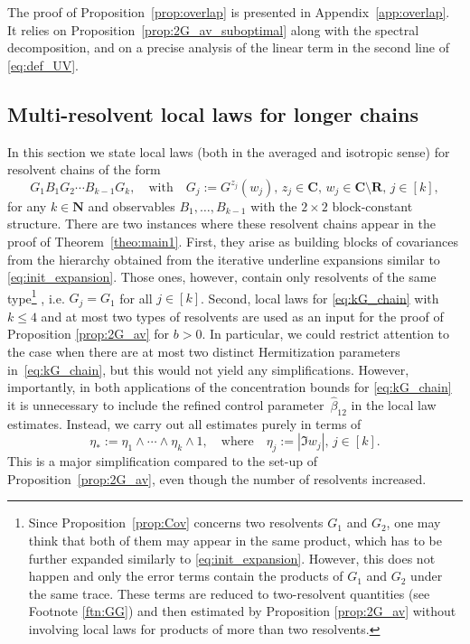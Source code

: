 \documentclass[10pt]{amsart}
\numberwithin{equation}{section}
\newcommand{\R}{\mathbf{R}}
\newcommand{\C}{\mathbf{C}}
\newcommand{\N}{\mathbf{N}}
\begin{document}
The proof of Proposition~\ref{prop:overlap} is presented in Appendix~\ref{app:overlap}. It relies on Proposition~\ref{prop:2G_av_suboptimal} along with the spectral decomposition, and on a precise analysis of the linear term in the second line of \eqref{eq:def_UV}.


\subsection{Multi-resolvent local laws for longer chains}
\label{sec:multlonggs}

In this section we state local laws (both in the averaged and isotropic sense) for resolvent chains of the form
\begin{equation}
G_1B_1G_2\cdots B_{k-1}G_k,\quad\text{with}\quad G_j:=G^{z_j}(w_j),\, z_j\in\C,\, w_j\in\C\setminus\R,\, j\in [k],
\label{eq:kG_chain}
\end{equation}
for any $k\in \N$ and observables $B_1,\ldots,B_{k-1}$ with the $2\times 2$ block-constant structure. There are two instances where these resolvent chains appear in the proof of Theorem~\ref{theo:main1}. First, they arise as building blocks of covariances from the hierarchy obtained from the iterative underline expansions similar to \eqref{eq:init_expansion}. Those ones, however, contain only resolvents of the same type\footnote{Since Proposition~\ref{prop:Cov} concerns two resolvents $G_1$ and $G_2$, one may think that both of them may appear in the same product, which has to be further expanded similarly to \eqref{eq:init_expansion}. However, this does not happen and only the error terms contain the products of $G_1$ and $G_2$ under the same trace. These terms are reduced to two-resolvent quantities (see Footnote \ref{ftn:GG}) and then estimated by Proposition \ref{prop:2G_av} without involving local laws for products of more than two resolvents.} , i.e. $G_j=G_1$ for all $j\in [k]$. Second, local laws for \eqref{eq:kG_chain} with $k\le 4$ and at most two types of resolvents are used as an input for the proof of Proposition \ref{prop:2G_av} for $b>0$. In particular, we could restrict attention to the case when there are at most two distinct Hermitization parameters in~\eqref{eq:kG_chain}, but this would not yield any simplifications. However, importantly, in both applications of the concentration bounds for \eqref{eq:kG_chain} it is unnecessary to include the refined control parameter~$\widehat{\beta}_{12}$ in the local law estimates. Instead, we carry out all estimates purely in terms of
\begin{equation}
\eta_*:=\eta_1\wedge\cdots \wedge\eta_k\wedge 1,\quad\text{where}\quad \eta_j:=|\Im w_j|,\, j\in [k].
\label{eq:def_eta*_multiG}
\end{equation}
This is a major simplification compared to the set-up of Proposition~\ref{prop:2G_av}, even though the number of resolvents increased. 
\end{document}
